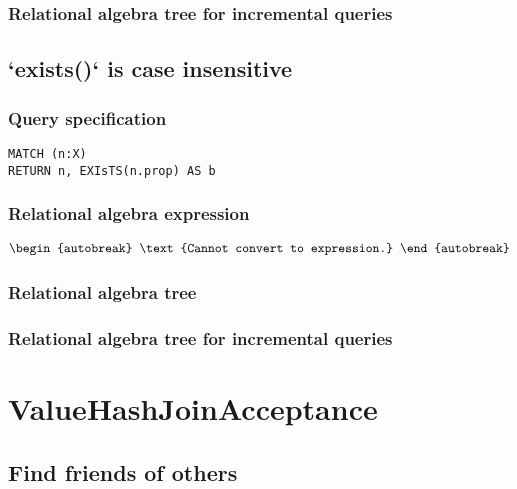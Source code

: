\subsubsection*{Relational algebra tree for incremental queries}


\subsection{`exists()` is case insensitive}

\subsubsection*{Query specification}

\begin{lstlisting}
MATCH (n:X)
RETURN n, EXIsTS(n.prop) AS b
\end{lstlisting}

\subsubsection*{Relational algebra expression}

\begin{align*}
\begin{autobreak}
\text{Cannot convert to expression.}
\end{autobreak}
\end{align*}

\subsubsection*{Relational algebra tree}


\subsubsection*{Relational algebra tree for incremental queries}

\section{ValueHashJoinAcceptance}


\subsection{Find friends of others}


